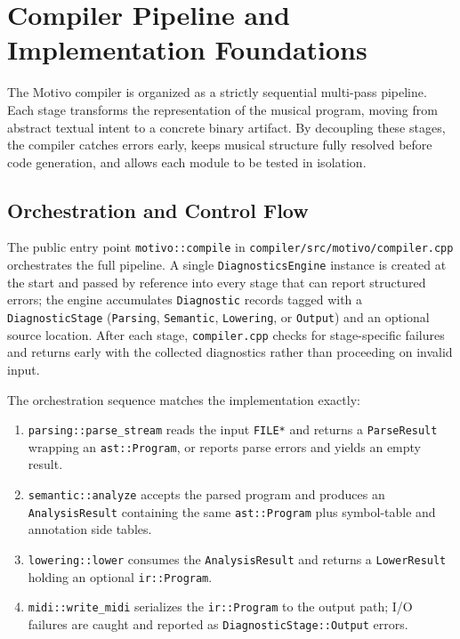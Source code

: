 \section{Compiler Pipeline and Implementation Foundations}\label{sec:compiler-pipeline}

The Motivo compiler is organized as a strictly sequential multi-pass pipeline.
Each stage transforms the representation of the musical program, moving from abstract textual intent to a
concrete binary
artifact.
By decoupling these stages, the compiler catches errors early, keeps musical structure fully resolved before code
generation, and allows each module to be tested in isolation.

\subsection{Orchestration and Control Flow}\label{detail-subsec:orchestration}

The public entry point \texttt{motivo::compile} in \texttt{compiler/src/motivo/compiler.cpp} orchestrates the full
pipeline.
A single \texttt{DiagnosticsEngine} instance is created at the start and passed by reference into every stage that can
report structured errors; the engine accumulates \texttt{Diagnostic} records tagged with a \texttt{DiagnosticStage}
(\texttt{Parsing}, \texttt{Semantic}, \texttt{Lowering}, or \texttt{Output}) and an optional source location.
After each stage, \texttt{compiler.cpp} checks for stage-specific failures and returns early with the collected
diagnostics rather than proceeding on invalid input.

The orchestration sequence matches the implementation exactly:

\begin{enumerate}
  \item \texttt{parsing::parse\_stream} reads the input \texttt{FILE*} and returns a \texttt{ParseResult} wrapping an
    \texttt{ast::Program}, or reports parse errors and yields an empty result.
  \item \texttt{semantic::analyze} accepts the parsed program and produces an \texttt{AnalysisResult} containing the
    same \texttt{ast::Program} plus symbol-table and annotation side tables.
  \item \texttt{lowering::lower} consumes the \texttt{AnalysisResult} and returns a \texttt{LowerResult} holding an
    optional \texttt{ir::Program}.
  \item \texttt{midi::write\_midi} serializes the \texttt{ir::Program} to the output path; I/O failures are caught and
    reported as \texttt{DiagnosticStage::Output} errors.
\end{enumerate}

